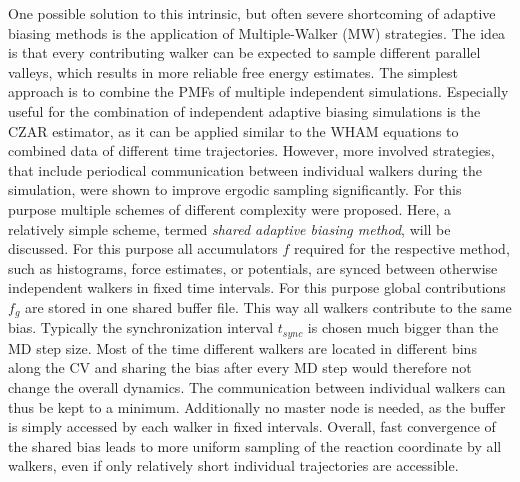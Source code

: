 One possible solution to this intrinsic, but often severe shortcoming of adaptive biasing methods is the application of Multiple-Walker (MW) strategies.
The idea is that every contributing walker can be expected to sample different parallel valleys, which results in more reliable free energy estimates.\autocite{minoukadeh2010potential}
The simplest approach is to combine the PMFs of multiple independent simulations.
Especially useful for the combination of independent adaptive biasing simulations is the CZAR estimator, as it can be applied similar to the WHAM equations to combined data of different time trajectories.\autocite{lesage2017smoothed}
However, more involved strategies, that include periodical communication between individual walkers during the simulation, were shown to improve ergodic sampling significantly.\autocite{fu2019taming}
For this purpose multiple schemes of different complexity were proposed.\autocite{wilson2011molecular,comer2014calculation,minoukadeh2010potential}
Here, a relatively simple scheme, termed \textit{shared adaptive biasing method}\autocite{comer2015adaptive}, will be discussed.
For this purpose all accumulators $f$ required for the respective method, such as histograms, force estimates, or potentials, are synced between otherwise independent walkers in fixed time intervals.
For this purpose global contributions $f_g$ are stored in one shared buffer file.
This way all walkers contribute to the same bias.
Typically the synchronization interval $t_{sync}$ is chosen much bigger than the MD step size.
Most of the time different walkers are located in different bins along the CV and sharing the bias after every MD step would therefore not change the overall dynamics.
The communication between individual walkers can thus be kept to a minimum.
Additionally no master node is needed, as the buffer is simply accessed by each walker in fixed intervals.
Overall, fast convergence of the shared bias leads to more uniform sampling of the reaction coordinate by all walkers, even if only relatively short individual trajectories are accessible.
